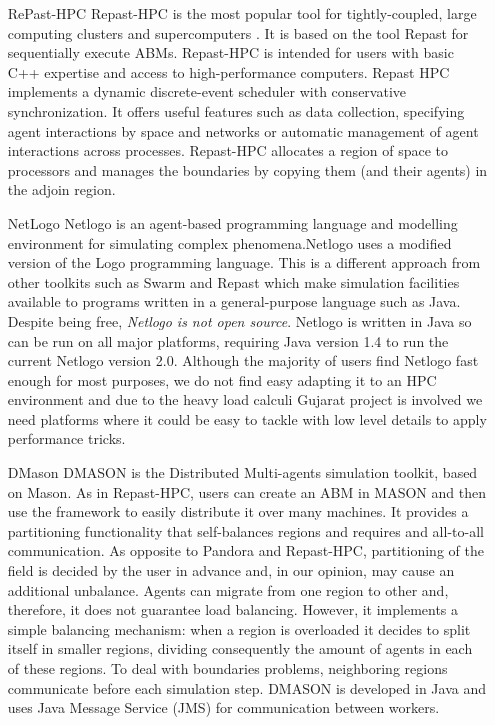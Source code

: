 \documentclass[11pt,oneside,a4paper,openright]{report}
\begin{document}
\begin{enumerate}
\renewcommand{\labelitemi}{$\bullet$}
\renewcommand{\labelitemii}{$\cdot$}
\\
\item[RePast-HPC]
Repast-HPC is the most popular tool for tightly-coupled, large computing clusters and
supercomputers \cite{CollierNorth2012}. It is based on the tool Repast for sequentially execute ABMs.
Repast-HPC is intended for users with basic C++ expertise and access to high-performance computers.
Repast HPC implements a dynamic discrete-event scheduler with conservative synchronization. It offers
useful features such as data collection, specifying agent interactions by space and networks or automatic
management of agent interactions across processes. Repast-HPC allocates a region of space to processors
and manages the boundaries by copying them (and their agents) in the adjoin region. 
\\
\item[NetLogo]
Netlogo\cite{netlogoCite} is an agent-based programming language and modelling environment for
simulating complex phenomena.Netlogo uses a modified version of the Logo programming language.
This is a different approach from other toolkits such as Swarm and Repast
which make simulation facilities available to programs written in a general-purpose
language such as Java. Despite being free, \emph{Netlogo is not open source}. Netlogo is
written in Java so can be run on all major platforms, requiring Java version 1.4 to
run the current Netlogo version 2.0. Although the majority of users find Netlogo
fast enough for most purposes, we do not find easy adapting it to an HPC environment and
due to the heavy load calculi Gujarat project is involved we need platforms where it could be
easy to tackle with low level details to apply performance tricks.
\\
\item[DMason]
DMASON is the Distributed Multi-agents simulation toolkit, based on Mason. As in Repast-HPC, users can create an ABM in MASON and then use the framework to easily distribute it over many machines. It provides a partitioning functionality that self-balances regions and requires and all-to-all communication. As opposite to Pandora and Repast-HPC, partitioning of the field is decided by the user in advance and, in our opinion, may cause an additional unbalance. Agents can migrate from one region to other and, therefore, it does not guarantee load balancing. However, it implements a simple balancing mechanism: when a region is overloaded it decides to split itself in smaller regions, dividing consequently the amount of agents in each of these regions. To deal with boundaries problems,
neighboring regions communicate before each simulation step. DMASON is developed in Java and uses
Java Message Service (JMS) for communication between workers.


\end{enumerate}
\end{document}
